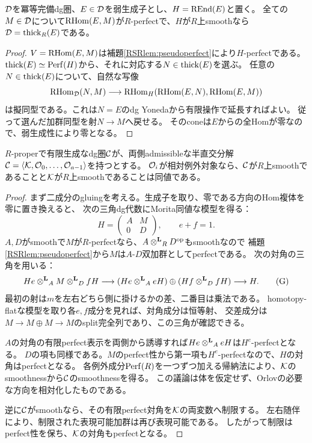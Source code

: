 \begin{lemma}[弱生成子による全体の回収]\label{RSRlem:fullness}
$\mathcal D$を冪等完備dg圏、$E\in\mathcal D$を弱生成子とし、$H=\operatorname{REnd}(E)$と置く。
全ての$M\in\mathcal D$について$\operatorname{RHom}(E,M)$が$R$-perfectで、$H$が$R$上smoothなら
$\mathcal D=\operatorname{thick}_R(E)$である。
\end{lemma}
\begin{proof}
$V=\operatorname{RHom}(E,M)$は補題\ref{RSRlem:pseudoperfect}により$H$-perfectである。
$\operatorname{thick}(E)\simeq\operatorname{Perf}(H)$から、それに対応する$N\in\operatorname{thick}(E)$を選ぶ。
任意の$N\in\operatorname{thick}(E)$について、自然な写像
\[
 \operatorname{RHom}_{\mathcal D}(N,M)\longrightarrow
 \operatorname{RHom}_H(\operatorname{RHom}(E,N),\operatorname{RHom}(E,M))
\]
は擬同型である。これは$N=E$のdg Yonedaから有限操作で延長すればよい。
従って選んだ加群同型を射$N\to M$へ戻せる。
そのconeは$E$からの全Homが零なので、弱生成性により零となる。
\end{proof}

\begin{proposition}[相対gluingのsmoothness]\label{RSRprop:gluing}
$R$-properで有限生成なdg圏$\mathcal C$が、両側admissibleな半直交分解
$\mathcal C=\langle\mathcal K,\mathcal O_0,\ldots,\mathcal O_{a-1}\rangle$を持つとする。
$\mathcal O_i$が相対例外対象なら、$\mathcal C$が$R$上smoothであることと$\mathcal K$が$R$上smoothであることは同値である。
\end{proposition}
\begin{proof}
まず二成分のgluingを考える。生成子を取り、零である方向のHom複体を零に置き換えると、
次の三角dg代数にMorita同値な模型を得る：
\[
 H=\begin{pmatrix}A&M\\0&D\end{pmatrix},\qquad e+f=1.
\]
$A,D$がsmoothで$M$が$R$-perfectなら、$A\mathbin{\otimes^{\mathbf L}}_RD^{\mathrm{op}}$もsmoothなので
補題\ref{RSRlem:pseudoperfect}から$M$は$A$-$D$双加群としてperfectである。
次の対角の三角を用いる：
\[
 He\mathbin{\otimes^{\mathbf L}}_A M\mathbin{\otimes^{\mathbf L}}_D fH\longrightarrow
 (He\mathbin{\otimes^{\mathbf L}}_A eH)\oplus(Hf\mathbin{\otimes^{\mathbf L}}_D fH)
 \longrightarrow H.
 \tag{G}\label{RSReq:gluing-diagonal}
\]
最初の射は$m$を左右どちら側に掛けるかの差、二番目は乗法である。
homotopy-flatな模型を取り各$e,f$成分を見れば、対角成分は恒等射、
交差成分は$M\to M\oplus M\to M$のsplit完全列であり、この三角が確認できる。

$A$の対角の有限perfect表示を両側から誘導すれば$He\mathbin{\otimes^{\mathbf L}}_A eH$は$H^e$-perfectとなる。
$D$の項も同様である。$M$のperfect性から第一項も$H^e$-perfectなので、$H$の対角はperfectとなる。
各例外成分$\operatorname{Perf}(R)$を一つずつ加える帰納法により、$\mathcal K$のsmoothnessから$\mathcal C$のsmoothnessを得る。
この議論は体を仮定せず、Orlov\cite[Theorem 3.25]{RSROrlov}の必要な方向を相対化したものである。

逆に$\mathcal C$がsmoothなら、その有限perfect対角を$\mathcal K$の両変数へ制限する。
左右随伴により、制限された表現可能加群は再び表現可能である。
したがって制限はperfect性を保ち、$\mathcal K$の対角もperfectとなる。
\end{proof}

